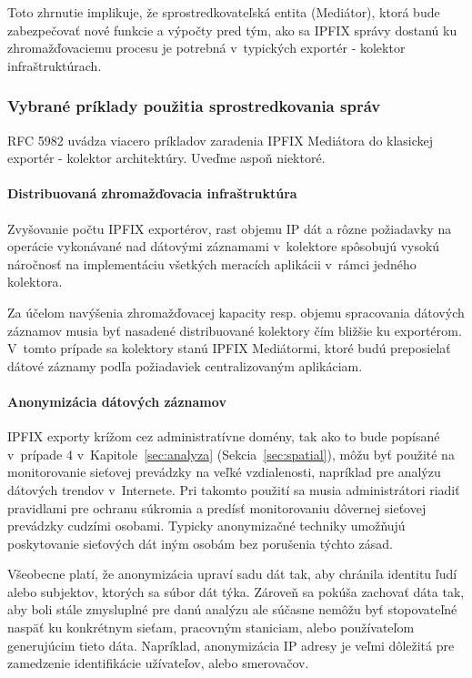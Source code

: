 Toto zhrnutie implikuje, že sprostredkovateľská entita (Mediátor), ktorá bude zabezpečovať nové funkcie 
a výpočty pred tým, ako sa IPFIX správy dostanú ku zhromažďovaciemu procesu je potrebná v~typických
exportér - kolektor infraštruktúrach.  


\subsubsection{Vybrané príklady použitia sprostredkovania správ} \label{sec:mediator_examples}


RFC 5982 \citep{rfc5982} uvádza viacero príkladov zaradenia IPFIX Mediátora do klasickej
exportér - kolektor architektúry. Uveďme aspoň niektoré.


\paragraph{Distribuovaná zhromažďovacia infraštruktúra}

Zvyšovanie počtu IPFIX exportérov, rast objemu IP dát a rôzne požiadavky na operácie vykonávané nad 
dátovými záznamami v~kolektore spôsobujú vysokú náročnosť na implementáciu všetkých meracích
aplikácii v~rámci jedného kolektora.

Za účelom navýšenia zhromažďovacej kapacity resp. objemu spracovania dátových záznamov musia byť 
nasadené distribuované kolektory čím bližšie ku exportérom. V~tomto prípade sa kolektory stanú 
IPFIX Mediátormi, ktoré budú preposielať dátové záznamy podľa požiadaviek centralizovaným aplikáciam.


\paragraph{Anonymizácia dátových záznamov}

IPFIX exporty krížom cez administratívne domény, tak ako to bude popísané v~prípade 4 
v~Kapitole~\ref{sec:analyza} (Sekcia~\ref{sec:spatial}), môžu 
byť použité na monitorovanie sieťovej prevádzky na veľké vzdialenosti, 
napríklad pre analýzu dátových trendov v~Internete. Pri takomto použití sa musia administrátori riadiť
pravidlami pre ochranu súkromia a predísť monitorovaniu dôvernej sieťovej prevádzky cudzími osobami.
Typicky anonymizačné techniky umožňujú poskytovanie sieťových dát iným osobám bez porušenia týchto zásad.

Všeobecne platí, že anonymizácia upraví sadu dát tak, aby chránila identitu ľudí alebo subjektov, 
ktorých sa súbor dát týka. Zároveň sa pokúša zachovať dáta tak, aby boli stále zmysluplné pre danú 
analýzu ale súčasne nemôžu byť stopovateľné naspäť ku konkrétnym sieťam, pracovným staniciam, alebo 
používateľom generujúcim tieto dáta. Napríklad, anonymizácia IP adresy je veľmi dôležitá pre 
zamedzenie identifikácie užívateľov, alebo smerovačov. 

